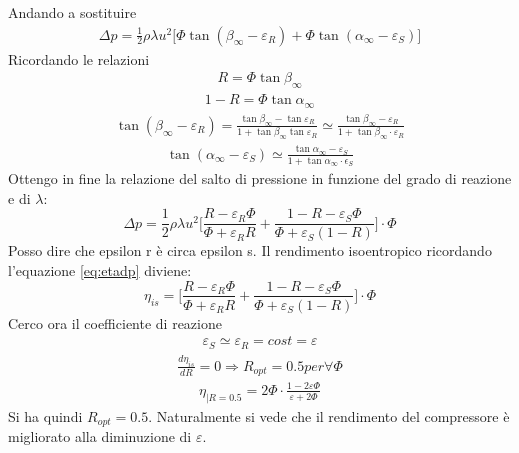 Andando a sostituire
\begin{align*}
\Delta p = \frac{1}{2} \rho \lambda u^2 \big[ \Phi \tan \left( \beta_{\infty} - \varepsilon_R \right) + \Phi \tan \left( \alpha_{\infty} - \varepsilon_S \right) \big] 
\end{align*}
Ricordando le relazioni
\begin{align*}
R = \Phi \tan \beta_{\infty}
\end{align*}
\begin{align*}
1 - R = \Phi \tan \alpha_{\infty} 
\end{align*}
\begin{align*}
\tan ( \beta_{\infty} - \varepsilon_R ) = \frac{\tan \beta_{\infty} - \tan \varepsilon_R}{1 + \tan \beta_{\infty} \tan \varepsilon_R} \simeq \frac{\tan \beta_{\infty} - \varepsilon_R}{1 + \tan \beta_{\infty} \cdot \varepsilon_R}
\end{align*}
\begin{align*}
\tan (\alpha_{\infty} - \varepsilon_S) \simeq \frac{\tan \alpha_{\infty} - \varepsilon_S}{1 + \tan \alpha_{\infty} \cdot \epsilon_S}
\end{align*}
Ottengo in fine la relazione del salto di pressione in funzione del grado di reazione e di $\lambda$:
\begin{equation}
\Delta p = \frac{1}{2} \rho \lambda u^2 \Bigg[ \frac{R - \varepsilon_R \Phi}{\Phi + \varepsilon_R R} + \frac{1 - R - \varepsilon_S \Phi}{\Phi + \varepsilon_S (1-R)} \Bigg] \cdot \Phi
\end{equation}
Posso dire che epsilon r è circa epsilon s. Il rendimento isoentropico ricordando l'equazione \ref{eq:etadp} diviene:
\begin{equation}
\boxed{ \eta_{is} = \Bigg[ \frac{R - \varepsilon_R \Phi}{\Phi + \varepsilon_R R} + \frac{1 - R - \varepsilon_S \Phi}{\Phi + \varepsilon_S (1-R)} \Bigg] \cdot \Phi }
\end{equation}
Cerco ora il coefficiente di reazione
\begin{align*}
\varepsilon_S \simeq \varepsilon_R = cost = \varepsilon
\end{align*}
\begin{align*}
\frac{d \eta_{is}}{dR} = 0 \Rightarrow R_{opt} = 0.5 per \forall \Phi
\end{align*}
\begin{align*}
\eta_{|R= 0.5} = 2 \Phi \cdot \frac{1- 2 \varepsilon \Phi}{\varepsilon + 2 \Phi}
\end{align*}
Si ha quindi $R_{opt} = 0.5$. 
Naturalmente si vede che il rendimento del compressore è migliorato alla diminuzione di $\varepsilon$.
